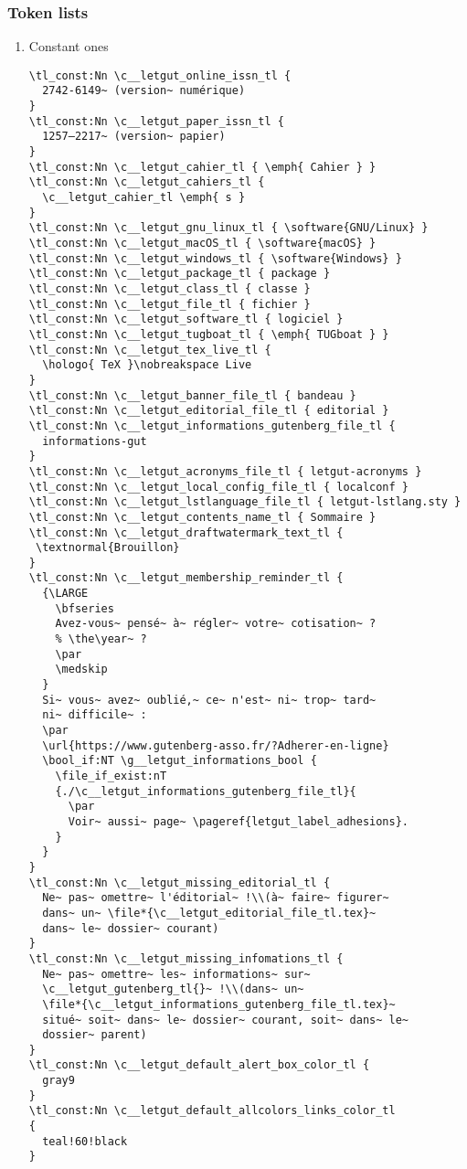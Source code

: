 \documentclass{letgut}
\begin{document}
\subsubsection{Token lists}
\label{ImplementationDeclarationsTokenlists-grbg55h0jlj0}
\begin{enumerate}
\item Constant ones
\label{ImplementationDeclarationsTokenlistsConstantones-obcg55h0jlj0}
\begin{lstlisting}
\tl_const:Nn \c__letgut_online_issn_tl {
  2742-6149~ (version~ numérique)
}
\tl_const:Nn \c__letgut_paper_issn_tl {
  1257–2217~ (version~ papier)
}
\tl_const:Nn \c__letgut_cahier_tl { \emph{ Cahier } }
\tl_const:Nn \c__letgut_cahiers_tl {
  \c__letgut_cahier_tl \emph{ s }
}
\tl_const:Nn \c__letgut_gnu_linux_tl { \software{GNU/Linux} }
\tl_const:Nn \c__letgut_macOS_tl { \software{macOS} }
\tl_const:Nn \c__letgut_windows_tl { \software{Windows} }
\tl_const:Nn \c__letgut_package_tl { package }
\tl_const:Nn \c__letgut_class_tl { classe }
\tl_const:Nn \c__letgut_file_tl { fichier }
\tl_const:Nn \c__letgut_software_tl { logiciel }
\tl_const:Nn \c__letgut_tugboat_tl { \emph{ TUGboat } }
\tl_const:Nn \c__letgut_tex_live_tl {
  \hologo{ TeX }\nobreakspace Live
}
\tl_const:Nn \c__letgut_banner_file_tl { bandeau }
\tl_const:Nn \c__letgut_editorial_file_tl { editorial }
\tl_const:Nn \c__letgut_informations_gutenberg_file_tl {
  informations-gut
}
\tl_const:Nn \c__letgut_acronyms_file_tl { letgut-acronyms }
\tl_const:Nn \c__letgut_local_config_file_tl { localconf }
\tl_const:Nn \c__letgut_lstlanguage_file_tl { letgut-lstlang.sty }
\tl_const:Nn \c__letgut_contents_name_tl { Sommaire }
\tl_const:Nn \c__letgut_draftwatermark_text_tl {
 \textnormal{Brouillon}
}
\tl_const:Nn \c__letgut_membership_reminder_tl {
  {\LARGE
    \bfseries
    Avez-vous~ pensé~ à~ régler~ votre~ cotisation~ ?
    % \the\year~ ?
    \par
    \medskip
  }
  Si~ vous~ avez~ oublié,~ ce~ n'est~ ni~ trop~ tard~
  ni~ difficile~ :
  \par
  \url{https://www.gutenberg-asso.fr/?Adherer-en-ligne}
  \bool_if:NT \g__letgut_informations_bool {
    \file_if_exist:nT
    {./\c__letgut_informations_gutenberg_file_tl}{
      \par
      Voir~ aussi~ page~ \pageref{letgut_label_adhesions}.
    }
  }
}
\tl_const:Nn \c__letgut_missing_editorial_tl {
  Ne~ pas~ omettre~ l'éditorial~ !\\(à~ faire~ figurer~
  dans~ un~ \file*{\c__letgut_editorial_file_tl.tex}~
  dans~ le~ dossier~ courant)
}
\tl_const:Nn \c__letgut_missing_infomations_tl {
  Ne~ pas~ omettre~ les~ informations~ sur~
  \c__letgut_gutenberg_tl{}~ !\\(dans~ un~
  \file*{\c__letgut_informations_gutenberg_file_tl.tex}~
  situé~ soit~ dans~ le~ dossier~ courant, soit~ dans~ le~
  dossier~ parent)
}
\tl_const:Nn \c__letgut_default_alert_box_color_tl {
  gray9
}
\tl_const:Nn \c__letgut_default_allcolors_links_color_tl
{
  teal!60!black
}
\end{lstlisting}


\end{enumerate}
\end{document}
